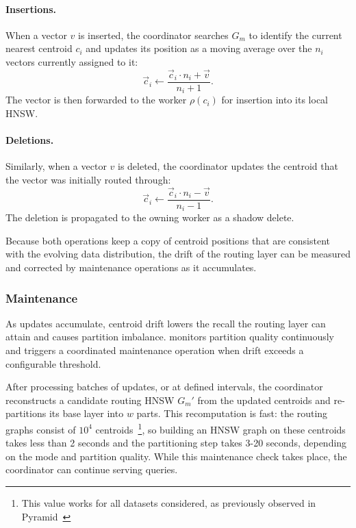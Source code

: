 \documentclass[sigconf,review,anonymous]{acmart}
\begin{document}
    \paragraph{Insertions.} When a vector $v$ is inserted, the coordinator searches $G_m$ to identify the current nearest centroid $c_i$ and updates its position as a moving average over the $n_i$ vectors currently assigned to it:
    \[
      \vec{c}_i \leftarrow \frac{\vec{c}_i \cdot n_i + \vec{v}}{n_i + 1}.
    \]
    The vector is then forwarded to the worker $\rho(c_i)$ for insertion into its local HNSW.
    
    \paragraph{Deletions.} Similarly, when a vector $v$ is deleted, the coordinator updates the centroid that the vector was initially routed through:
    \[
      \vec{c}_i \leftarrow \frac{\vec{c}_i \cdot n_i - \vec{v}}{n_i - 1}.
    \]
    The deletion is propagated to the owning worker as a shadow delete.

    Because both operations keep a copy of centroid positions that are consistent with the evolving data distribution, the drift of the routing layer can be measured and corrected by maintenance operations as it accumulates.
    

\subsubsection{Maintenance}
    As updates accumulate, centroid drift lowers the recall the routing layer can attain and causes partition imbalance. \SystemName{} monitors partition quality continuously and triggers a coordinated maintenance operation when drift exceeds a configurable threshold.
    
    After processing batches of updates, or at defined intervals, the coordinator reconstructs a candidate routing HNSW $G_m'$ from the updated centroids and re-partitions its base layer into $w$ parts. This recomputation is fast: the routing graphs consist of $10^4$ centroids~\footnote{This value works for all datasets considered, as previously observed in Pyramid~\cite{deng2019pyramid}}, so building an HNSW graph on these centroids takes less than 2 seconds and the partitioning step takes 3-20 seconds, depending on the mode and partition quality. While this maintenance check takes place, the coordinator can continue serving queries.
\end{document}
